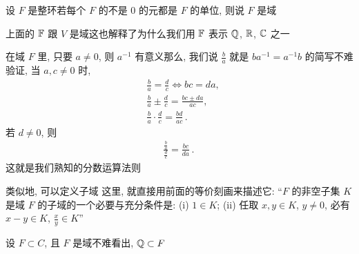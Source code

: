 \begin{definition}
    设 $F$ 是整环\period 若每个 $F$ 的不是 $0$ 的元都是 $F$ 的单位, 则说 $F$ 是域 \period
\end{definition}

\begin{example}
    上面的 $\mathbb{F}$ 跟 $V$ 是域\period 这也解释了为什么我们用 $\mathbb{F}$ 表示 $\mathbb{Q}$, $\mathbb{R}$, $\mathbb{C}$ 之一\period
\end{example}

\begin{remark}
    在域 $F$ 里, 只要 $a \neq 0$, 则 $a^{-1}$ 有意义\period 那么, 我们说 $\frac{b}{a}$ 就是 $ba^{-1} = a^{-1}b$ 的简写\period 不难验证, 当 $a,c \neq 0$ 时,
    \begin{align*}
         & \frac{b}{a} = \frac{d}{c} \iff bc = da,              \\
         & \frac{b}{a} \pm \frac{d}{c} = \frac{bc \pm da}{ac},  \\
         & \frac{b}{a} \cdot \frac{d}{c} = \frac{bd}{ac}\period
    \end{align*}
    若 $d \neq 0$, 则
    \begin{align*}
        \frac{\frac{b}{a}}{\frac{d}{c}} = \frac{bc}{da}\period
    \end{align*}
    这就是我们熟知的分数运算法则\period
\end{remark}

\begin{remark}
    类似地, 可以定义子域 \period 这里, 就直接用前面的等价刻画来描述它: ``$F$ 的非空子集 $K$ 是域 $F$ 的子域的一个必要与充分条件是: (i) $1 \in K$; (ii) 任取 $x,y \in K$, $y \neq 0$, 必有 $x-y \in K$, $\frac{x}{y} \in K$\period ''
\end{remark}

\begin{example}
    设 $F \subset C$, 且 $F$ 是域\period 不难看出, $\mathbb{Q} \subset F$\period
\end{example}
